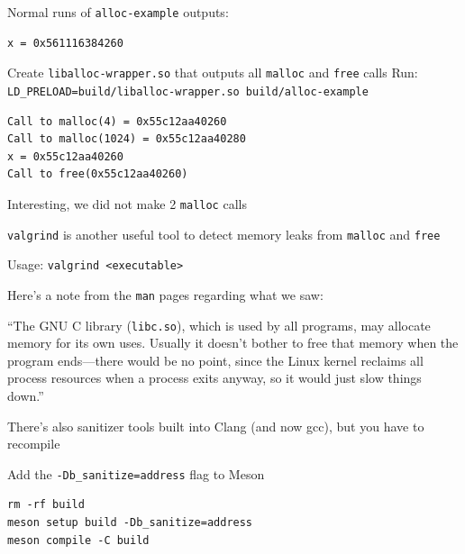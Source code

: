  \begin{slide}
    

    Normal runs of \texttt{alloc-example} outputs:
    \begin{verbatim}
x = 0x561116384260
    \end{verbatim}
    \medskip

    Create \texttt{liballoc-wrapper.so} that outputs all \texttt{malloc} and
    \texttt{free} calls \newline
    \leftspace{} Run: \texttt{LD_PRELOAD=build/liballoc-wrapper.so build/alloc-example}

    \begin{verbatim}
Call to malloc(4) = 0x55c12aa40260                  
Call to malloc(1024) = 0x55c12aa40280
x = 0x55c12aa40260
Call to free(0x55c12aa40260)
    \end{verbatim}
    \bigskip

    Interesting, we did not make 2 \texttt{malloc} calls
  \end{slide}

\begin{slide}
  

  \texttt{valgrind} is another useful tool to detect memory leaks from
  \texttt{malloc} and \texttt{free}

  \leftspace{}Usage: \texttt{valgrind <executable>}
  \bigskip


  Here's a note from the \texttt{man} pages regarding what we saw:
  \medskip

  ``The GNU C library (\texttt{libc.so}), which is used by all programs,
    may allocate memory for its own uses. Usually it doesn't bother to free
    that memory when the program ends—there would be no point, since the Linux
    kernel reclaims all process resources when a process exits anyway, so it
    would just slow things down.''
  \bigskip

\end{slide}

\begin{slide}
  

  There's also sanitizer tools built into Clang (and now gcc), but you have to
  recompile

  \leftspace{}Add the \texttt{-Db_sanitize=address} flag to Meson
  \bigskip

  \begin{verbatim}
rm -rf build
meson setup build -Db_sanitize=address
meson compile -C build
  \end{verbatim}
\end{slide}

